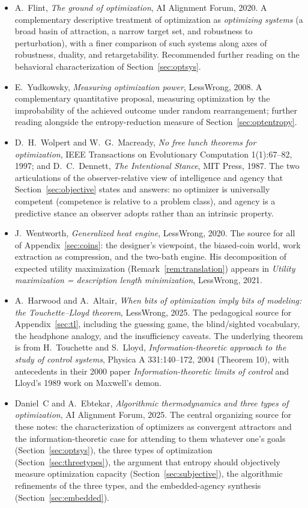 \documentclass[10pt]{article}
\theoremstyle{definition}
\theoremstyle{remark}
\begin{document}
\begin{itemize}[leftmargin=2em]
  \item A.~Flint, \emph{The ground of optimization}, AI Alignment Forum, 2020. A complementary descriptive treatment of optimization as \emph{optimizing systems} (a broad basin of attraction, a narrow target set, and robustness to perturbation), with a finer comparison of such systems along axes of robustness, duality, and retargetability. Recommended further reading on the behavioral characterization of Section~\ref{sec:optsys}.
  \item E.~Yudkowsky, \emph{Measuring optimization power}, LessWrong, 2008. A complementary quantitative proposal, measuring optimization by the improbability of the achieved outcome under random rearrangement; further reading alongside the entropy-reduction measure of Section~\ref{sec:optentropy}.
  \item D.~H.~Wolpert and W.~G.~Macready, \emph{No free lunch theorems for optimization}, IEEE Transactions on Evolutionary Computation 1(1):67--82, 1997; and D.~C.~Dennett, \emph{The Intentional Stance}, MIT Press, 1987. The two articulations of the observer-relative view of intelligence and agency that Section~\ref{sec:objective} states and answers: no optimizer is universally competent (competence is relative to a problem class), and agency is a predictive stance an observer adopts rather than an intrinsic property.
  \item J.~Wentworth, \emph{Generalized heat engine}, LessWrong, 2020. The source for all of Appendix~\ref{sec:coins}: the designer's viewpoint, the biased-coin world, work extraction as compression, and the two-bath engine. His decomposition of expected utility maximization (Remark~\ref{rem:translation}) appears in \emph{Utility maximization = description length minimization}, LessWrong, 2021.
  \item A.~Harwood and A.~Altair, \emph{When bits of optimization imply bits of modeling: the Touchette--Lloyd theorem}, LessWrong, 2025. The pedagogical source for Appendix~\ref{sec:tl}, including the guessing game, the blind/sighted vocabulary, the headphone analogy, and the insufficiency caveats. The underlying theorem is from H.~Touchette and S.~Lloyd, \emph{Information-theoretic approach to the study of control systems}, Physica A 331:140--172, 2004 (Theorem 10), with antecedents in their 2000 paper \emph{Information-theoretic limits of control} and Lloyd's 1989 work on Maxwell's demon.
  \item Daniel~C and A.~Ebtekar, \emph{Algorithmic thermodynamics and three types of optimization}, AI Alignment Forum, 2025. The central organizing source for these notes: the characterization of optimizers as convergent attractors and the information-theoretic case for attending to them whatever one's goals (Section~\ref{sec:optsys}), the three types of optimization (Section~\ref{sec:threetypes}), the argument that entropy should objectively measure optimization capacity (Section~\ref{sec:subjective}), the algorithmic refinements of the three types, and the embedded-agency synthesis (Section~\ref{sec:embedded}).

\end{itemize}
\end{document}
